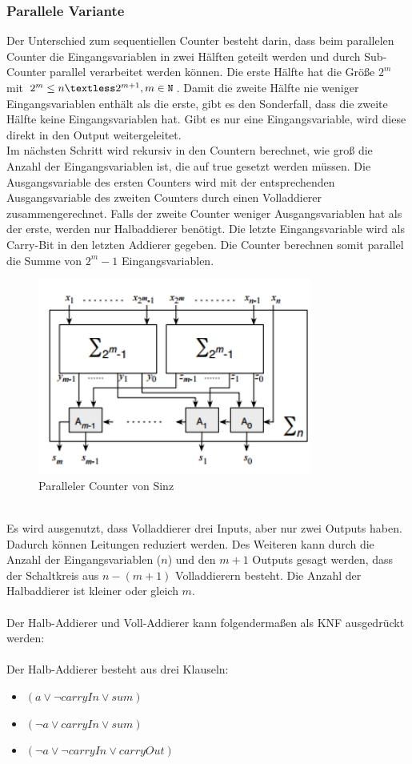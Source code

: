 \documentclass[a4,abstract=on]{scrartcl}
\begin{document}
		\subsubsection{Parallele Variante}
Der Unterschied zum sequentiellen Counter besteht darin, dass beim parallelen Counter die Eingangsvariablen in zwei Hälften geteilt werden und durch Sub-Counter parallel verarbeitet werden können. Die erste Hälfte hat die Größe $2^m$ mit  $2^m \leq n \textless 2^{m+1}, m \in \mathtt{N}$. Damit die zweite Hälfte nie weniger Eingangsvariablen enthält als die erste, gibt es den Sonderfall, dass die zweite Hälfte keine Eingangsvariablen hat. Gibt es nur eine Eingangsvariable, wird diese direkt in den Output weitergeleitet.\\
Im nächsten Schritt wird rekursiv in den Countern berechnet, wie groß die Anzahl der Eingangsvariablen ist, die auf true gesetzt werden müssen. Die Ausgangsvariable des ersten Counters wird mit der entsprechenden Ausgangsvariable des zweiten Counters durch einen Volladdierer zusammengerechnet. Falls der zweite Counter weniger Ausgangsvariablen hat als der erste, werden nur Halbaddierer benötigt. Die letzte Eingangsvariable wird als Carry-Bit in den letzten Addierer gegeben. Die Counter berechnen somit parallel die Summe von $2^m-1$ Eingangsvariablen.\\

\begin{figure}[H]
\centering
\includegraphics[width=9cm]{Sinz_para.png}
\caption{Paralleler Counter von Sinz \cite[siehe][Seite 9] {sinz}}
\label{fig:sinz_counter_para}
\end{figure}
\ \\
Es wird ausgenutzt, dass Volladdierer drei Inputs, aber nur zwei Outputs haben. Dadurch können Leitungen reduziert werden. Des Weiteren kann durch die Anzahl der Eingangsvariablen ($n$) und den $m+1$ Outputs gesagt werden, dass der Schaltkreis aus $n-(m+1)$ Volladdierern besteht. Die Anzahl der Halbaddierer ist kleiner oder gleich $m$.\\
\ \\
Der Halb-Addierer und Voll-Addierer kann folgendermaßen als KNF ausgedrückt werden:\\
\ \\
Der Halb-Addierer besteht aus drei Klauseln:
\begin{itemize}
\item $(a \vee \neg carryIn \vee sum)$
\item $(\neg a \vee carryIn \vee sum)$
\item $(\neg a \vee \neg carryIn \vee carryOut )$
\end{itemize}
\end{document}
